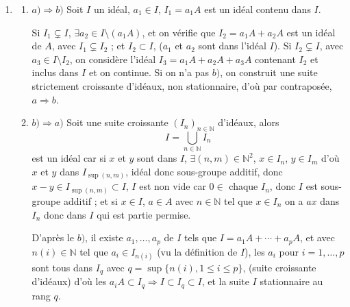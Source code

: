\begin{enumerate}[label=\arabic*.,leftmargin=2.2em,itemsep=1.15em]
En prenant $t$ sous forme irréductible, $p/q$, $t\in]0,1[\Rightarrow q>1$ et on a
\[
\left\{
\begin{aligned}
p(a-m)&=q(x-m),\\
p(b-n)&=q(y-n).
\end{aligned}
\right.
\]
Comme $q$ est premier à $p$, $q$ divise $a-m$ et $b-n$, (th. de Gauss) qui ne sont pas premiers entre eux.

Réciproquement si $(a-m)\wedge(b-n)=r>1$. Posons $a-m=pr$ et $b-n=qr$, $t=1/r$ et soit $x=ta+(1-t)m$ et $y=tb+(1-t)n$.

Le point $M(x,y)\in]P,Q[$ car $1/r\in]0,1[$.

Or
\[
x=\frac1r a+\left(1-\frac1r\right)m
=a+\frac{p-pr}{r}=a+p-pr\in\mathbb Z
\]
et on vérifie aussi que $y=b-qr+q\in\mathbb Z$ d'où $P$ et $Q$ ne vérifient pas $(*)$.

\item
\begin{enumerate}[label=\alph*),leftmargin=2em]
\item $a)\Rightarrow b)$ Soit $I$ un idéal, $a_1\in I$, $I_1=a_1A$ est un idéal contenu dans $I$.

Si $I_1\subsetneq I$, $\exists a_2\in I\setminus(a_1A)$, et on vérifie que $I_2=a_1A+a_2A$ est un idéal de $A$, avec $I_1\subsetneq I_2$ ; et $I_2\subset I$, ($a_1$ et $a_2$ sont dans l'idéal $I$). Si $I_2\subsetneq I$, avec $a_3\in I\setminus I_2$, on considère l'idéal $I_3=a_1A+a_2A+a_3A$ contenant $I_2$ et inclus dans $I$ et on continue. Si on n'a pas $b)$, on construit une suite strictement croissante d'idéaux, non stationnaire, d'où par contraposée, $a\Rightarrow b$.

\item $b)\Rightarrow a)$ Soit une suite croissante $(I_n)_{n\in\mathbb N}$ d'idéaux, alors
\[
I=\bigcup_{n\in\mathbb N}I_n
\]
est un idéal car si $x$ et $y$ sont dans $I$, $\exists(n,m)\in\mathbb N^2$, $x\in I_n$, $y\in I_m$ d'où $x$ et $y$ dans $I_{\sup(n,m)}$, idéal donc sous-groupe additif, donc $x-y\in I_{\sup(n,m)}\subset I$, $I$ est non vide car $0\in$ chaque $I_n$, donc $I$ est sous-groupe additif ; et si $x\in I$, $a\in A$ avec $n\in\mathbb N$ tel que $x\in I_n$ on a $ax$ dans $I_n$ donc dans $I$ qui est partie permise.

D'après le $b)$, il existe $a_1,\ldots,a_p$ de $I$ tels que $I=a_1A+\cdots+a_pA$, et avec $n(i)\in\mathbb N$ tel que $a_i\in I_{n(i)}$ (vu la définition de $I$), les $a_i$ pour $i=1,\ldots,p$ sont tous dans $I_q$ avec $q=\sup\{n(i),1\le i\le p\}$, (suite croissante d'idéaux) d'où les $a_iA\subset I_q\Rightarrow I\subset I_q\subset I$, et la suite $I$ stationnaire au rang $q$.
\end{enumerate}


\end{enumerate}

